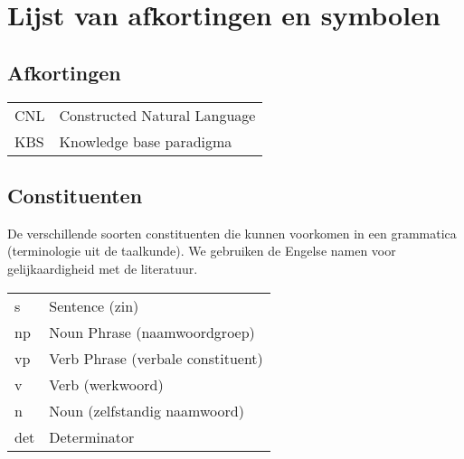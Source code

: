 \chapter{Lijst van afkortingen en symbolen}
\section*{Afkortingen}
\begin{flushleft}
  \renewcommand{\arraystretch}{1.1}
  \begin{tabularx}{\textwidth}{@{}p{12mm}X@{}}
    CNL   & Constructed Natural Language \\
    KBS   & Knowledge base paradigma \\
  \end{tabularx}
\end{flushleft}
\section*{Constituenten}
De verschillende soorten constituenten die kunnen voorkomen in een grammatica (terminologie uit de taalkunde). We gebruiken de Engelse namen voor gelijkaardigheid met de literatuur.
\begin{flushleft}
  \renewcommand{\arraystretch}{1.1}
  \begin{tabularx}{\textwidth}{@{}p{12mm}X@{}}
    s     & Sentence (zin) \\
    np    & Noun Phrase (naamwoordgroep) \\
    vp    & Verb Phrase (verbale constituent) \\
    v     & Verb (werkwoord) \\
    n     & Noun (zelfstandig naamwoord) \\
    det   & Determinator \\
  \end{tabularx}
\end{flushleft}

